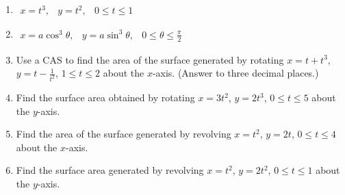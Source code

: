 \documentclass{exercises}
\begin{document}
\begin{enumerate}[resume]
\item $\begin{matrix}x=t^{3}, & y=t^{2}, & 0\le t\le1\end{matrix}$
\item $\begin{matrix}x=a\cos^{3}\theta, & y=a\sin^{3}\theta, & 0\le \theta\le\frac{\pi}{2}\end{matrix}$
\item \techrequired Use a CAS to find the area of the surface generated by rotating $x=t+t^{3}$, $y=t-\frac{1}{t^{2}}$, $1\le t\le2$ about the $x$-axis. (Answer to three decimal places.)
\item Find the surface area obtained by rotating $x=3t^{2}$, $y=2t^{3}$, $0\le t\le5$ about the $y$-axis.
\item Find the area of the surface generated by revolving $x=t^{2}$, $y=2t$, $0\le t\le4$ about the $x$-axis.
\item Find the surface area generated by revolving $x=t^{2}$, $y=2t^{2}$, $0\le t\le1$ about the $y$-axis.
\end{enumerate}
\end{document}
